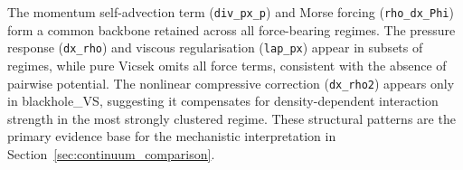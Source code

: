 \begin{table}[ht]
\centering\small
\caption{Cross-regime WSINDy coefficients for the $x$-polarisation equation
$(p_x)_t$.  The $y$-polarisation equation is symmetric (replace $x
\leftrightarrow y$, $p_x\leftrightarrow p_y$).  Column grouping matches
Table~\ref{tab:wsindy_cross_rho}.}
\label{tab:wsindy_cross_px}
\end{table}

The momentum self-advection term (\texttt{div\_px\_p}) and Morse forcing
(\texttt{rho\_dx\_Phi}) form a common backbone retained across all
force-bearing regimes.  The pressure response (\texttt{dx\_rho}) and
viscous regularisation (\texttt{lap\_px}) appear in subsets of regimes,
while pure Vicsek omits all force terms, consistent with the absence of
pairwise potential.  The nonlinear compressive correction
(\texttt{dx\_rho2}) appears only in blackhole\_VS, suggesting it
compensates for density-dependent interaction strength in the most
strongly clustered regime.  These structural patterns are the primary
evidence base for the mechanistic interpretation in
Section~\ref{sec:continuum_comparison}.

